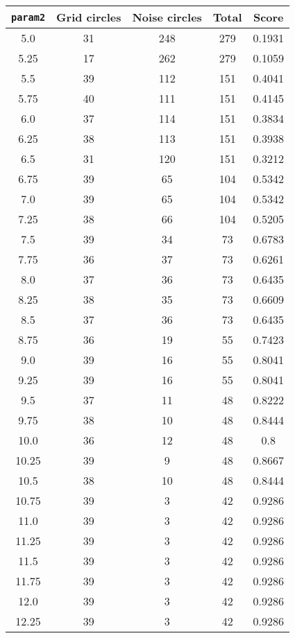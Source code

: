 \documentclass[letterpaper, 12pt]{article}
\begin{document}
\begin{longtable}{|c|c|c|c|c|}
\hline
\textbf{\texttt{param2}} & \textbf{Grid circles} & \textbf{Noise circles} & \textbf{Total} & \textbf{Score} \\
\hline
5.0 & 31 & 248 & 279 & 0.1931 \\
\hline
5.25 & 17 & 262 & 279 & 0.1059 \\
\hline
5.5 & 39 & 112 & 151 & 0.4041 \\
\hline
5.75 & 40 & 111 & 151 & 0.4145 \\
\hline
6.0 & 37 & 114 & 151 & 0.3834 \\
\hline
6.25 & 38 & 113 & 151 & 0.3938 \\
\hline
6.5 & 31 & 120 & 151 & 0.3212 \\
\hline
6.75 & 39 & 65 & 104 & 0.5342 \\
\hline
7.0 & 39 & 65 & 104 & 0.5342 \\
\hline
7.25 & 38 & 66 & 104 & 0.5205 \\
\hline
7.5 & 39 & 34 & 73 & 0.6783 \\
\hline
7.75 & 36 & 37 & 73 & 0.6261 \\
\hline
8.0 & 37 & 36 & 73 & 0.6435 \\
\hline
8.25 & 38 & 35 & 73 & 0.6609 \\
\hline
8.5 & 37 & 36 & 73 & 0.6435 \\
\hline
8.75 & 36 & 19 & 55 & 0.7423 \\
\hline
9.0 & 39 & 16 & 55 & 0.8041 \\
\hline
9.25 & 39 & 16 & 55 & 0.8041 \\
\hline
9.5 & 37 & 11 & 48 & 0.8222 \\
\hline
9.75 & 38 & 10 & 48 & 0.8444 \\
\hline
10.0 & 36 & 12 & 48 & 0.8 \\
\hline
10.25 & 39 & 9 & 48 & 0.8667 \\
\hline
10.5 & 38 & 10 & 48 & 0.8444 \\
\hline
10.75 & 39 & 3 & 42 & 0.9286 \\
\hline
11.0 & 39 & 3 & 42 & 0.9286 \\
\hline
11.25 & 39 & 3 & 42 & 0.9286 \\
\hline
11.5 & 39 & 3 & 42 & 0.9286 \\
\hline
11.75 & 39 & 3 & 42 & 0.9286 \\
\hline
12.0 & 39 & 3 & 42 & 0.9286 \\
\hline
12.25 & 39 & 3 & 42 & 0.9286 \\

\end{longtable}
\end{document}
